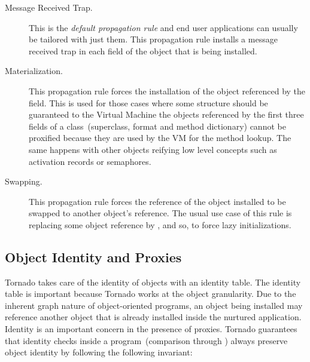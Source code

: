 \begin{description}
\item[Message Received Trap.] This is the \emph{default propagation rule} and end user applications can usually be tailored with just them. This propagation rule installs a message received trap in each field of the object that is being installed.
\item[Materialization.] This propagation rule forces the installation of the object referenced by the field. This is used for those cases where some structure should be guaranteed to the Virtual Machine \eg the objects referenced by the first three fields of a class~(superclass, format and method dictionary) cannot be proxified because they are used by the VM for the method lookup. The same happens with other objects reifying low level concepts such as activation records or semaphores.
\item[Swapping.] This propagation rule forces the reference of the object installed to be swapped to another object's reference. The usual use case of this rule is replacing some object reference by , and so, to force lazy initializations.
\end{description}

%

\subsection{Object Identity and Proxies}

Tornado takes care of the identity of objects with an identity table. The identity table is important because Tornado works at the object granularity. Due to the inherent graph nature of object-oriented programs, an object being installed may reference another object that is already installed inside the nurtured application.
Identity is an important concern in the presence of proxies. Tornado guarantees that identity checks inside a program~(\eg comparison through \ct{==}) always preserve object identity by following the following invariant: 

